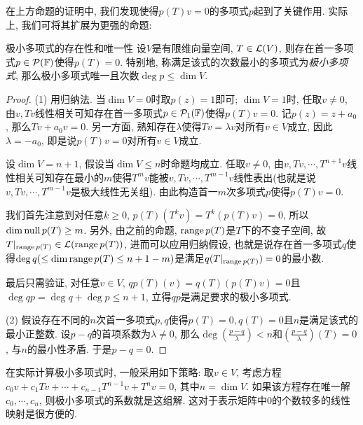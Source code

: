在上方命题的证明中, 我们发现使得$p(T)v=0$的多项式$p$起到了关键作用. 实际上, 我们可将其扩展为更强的命题: 

\begin{proposition}{极小多项式的存在性和唯一性}
	设$V$是有限维向量空间, $T \in \mathcal{L} (V)$, 则存在首一多项式$p \in \mathcal{P}(\mathbb{F})$使得$p(T)=0$. 特别地, 称满足该式的次数最小的多项式为\textit{极小多项式}, 那么极小多项式唯一且次数$\deg p \leq \dim V$. 
\end{proposition}
\begin{proof}
	(1) 用归纳法. 当$\dim V=0$时取$p(z)=1$即可; $\dim V=1$时, 任取$v \neq 0$, 由$v,Tv$线性相关可知存在首一多项式$p \in \mathcal{P}_1(\mathbb{F})$使得$p(T)v=0$. 记$p(z)=z+a_0$, 那么$Tv+a_0 v=0$. 另一方面, 熟知存在$\lambda$使得$Tv=\lambda v$对所有$v \in V$成立, 因此$\lambda = -a_0$, 即是说$p(T)v=0$对所有$v \in V$成立. 
	
	设$\dim V=n+1$, 假设当$\dim V \leq n$时命题均成立. 任取$v \neq 0$, 由$v,Tv,\cdots ,T^{n+1}v$线性相关可知存在最小的$m$使得$T^mv$能被$v,Tv,\cdots ,T^{m-1}v$线性表出(也就是说$v,Tv,\cdots ,T^{m-1}v$是极大线性无关组). 由此构造首一$m$次多项式$p$使得$p(T)v=0$. 
	
	我们首先注意到对任意$k \geq 0$, $p(T)(T^kv) = T^k(p(T)v)=0$, 所以$\dim \operatorname{null} p(T) \geq m$. 另外, 由之前的命题, $\operatorname{range} p(T)$是$T$下的不变子空间, 故$T|_{\operatorname{range} p(T)} \in \mathcal{L} (\operatorname{range} p(T))$, 进而可以应用归纳假设, 也就是说存在首一多项式$q$使得$\deg q (\leq \dim \operatorname{range} p(T) \leq n+1-m)$是满足$q(T|_{\operatorname{range} p(T)}) = 0$的最小数. 
	
	最后只需验证, 对任意$v \in V$, $qp(T)(v) = q(T)(p(T)v) = 0$且$\deg qp = \deg q + \deg p \leq n+1$, 立得$qp$是满足要求的极小多项式. 
	
	(2) 假设存在不同的$n$次首一多项式$p,q$使得$p(T)=0,q(T)=0$且$n$是满足该式的最小正整数. 设$p-q$的首项系数为$\lambda \neq 0$, 那么$\deg (\frac{p-q}{\lambda})<n$和$(\frac{p-q}{\lambda})(T)=0$, 与$n$的最小性矛盾. 于是$p-q=0$. 
\end{proof}

在实际计算极小多项式时, 一般采用如下策略: 取$v \in V$, 考虑方程$c_0v + c_1Tv + \cdots + c_{n-1}T^{n-1}v + T^nv = 0$, 其中$n=\dim V$. 如果该方程存在唯一解$c_0,\cdots ,c_n$, 则极小多项式的系数就是这组解. 这对于表示矩阵中$0$的个数较多的线性映射是很方便的. 

